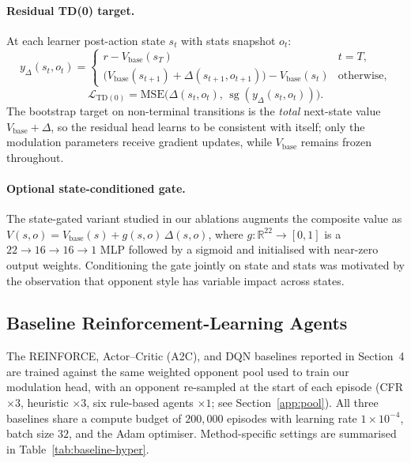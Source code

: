 \paragraph{Residual TD(0) target.}
At each learner post-action state $s_t$ with stats snapshot $o_t$:
\begin{equation*}
y_\Delta(s_t,o_t) =
\begin{cases}
r - V_{\text{base}}(s_T) & t = T, \\[3pt]
\bigl(V_{\text{base}}(s_{t+1}) + \Delta(s_{t+1},o_{t+1})\bigr) - V_{\text{base}}(s_t)
& \text{otherwise},
\end{cases}
\end{equation*}
\begin{equation*}
\mathcal{L}_{\text{TD}(0)} = \mathrm{MSE}\!\bigl(\Delta(s_t,o_t),\,\operatorname{sg}(y_\Delta(s_t,o_t))\bigr).
\end{equation*}
The bootstrap target on non-terminal transitions is the \emph{total} next-state
value $V_{\text{base}} + \Delta$, so the residual head learns to be consistent
with itself; only the modulation parameters receive gradient updates, while
$V_{\text{base}}$ remains frozen throughout.

\paragraph{Optional state-conditioned gate.}
The state-gated variant studied in our ablations augments the composite
value as $V(s,o) = V_{\text{base}}(s) + g(s,o)\,\Delta(s,o)$, where
$g: \mathbb{R}^{22} \to [0,1]$ is a $22 \to 16 \to 16 \to 1$ MLP followed
by a sigmoid and initialised with near-zero output weights. Conditioning
the gate jointly on state and stats was motivated by the observation that
opponent style has variable impact across states.

\subsection{Baseline Reinforcement-Learning Agents}

The REINFORCE, Actor--Critic (A2C), and DQN baselines reported in
Section~4 are trained against the same weighted opponent pool used to
train our modulation head, with an opponent re-sampled at the start of
each episode (CFR $\times 3$, heuristic $\times 3$, six rule-based agents
$\times 1$; see Section~\ref{app:pool}). All three baselines share a
compute budget of $200{,}000$ episodes with learning rate
$1 \times 10^{-4}$, batch size $32$, and the Adam optimiser. Method-specific
settings are summarised in Table~\ref{tab:baseline-hyper}.

